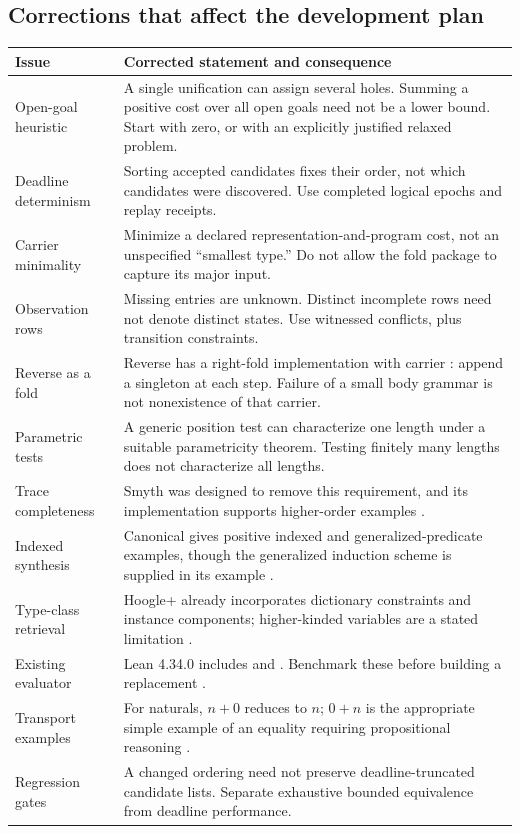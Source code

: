 \documentclass[11pt,a4paper]{article}
\newcommand{\code}[1]{\texttt{\detokenize{#1}}}
\theoremstyle{definition}
\theoremstyle{remark}
\begin{document}
\subsection{Corrections that affect the development plan}
\begin{longtable}{@{}L{.25\textwidth}L{.70\textwidth}@{}}
\toprule
Issue & Corrected statement and consequence\\
\midrule\endhead
Open-goal heuristic & A single unification can assign several holes. Summing a
positive cost over all open goals need not be a lower bound. Start with zero,
or with an explicitly justified relaxed problem.\\
Deadline determinism & Sorting accepted candidates fixes their order, not
which candidates were discovered. Use completed logical epochs and replay
receipts.\\
Carrier minimality & Minimize a declared representation-and-program cost, not
an unspecified ``smallest type.'' Do not allow the fold package to capture its
major input.\\
Observation rows & Missing entries are unknown. Distinct incomplete rows need
not denote distinct states. Use witnessed conflicts, plus transition
constraints.\\
Reverse as a fold & Reverse has a right-fold implementation with carrier
\code{List A}: append a singleton at each step. Failure of a small body grammar
is not nonexistence of that carrier.\\
Parametric tests & A generic position test can characterize one length under a
suitable parametricity theorem. Testing finitely many lengths does not
characterize all lengths.\\
Trace completeness & Smyth was designed to remove this requirement, and its
implementation supports higher-order examples \cite{smyth}.\\
Indexed synthesis & Canonical gives positive indexed and generalized-predicate
examples, though the generalized induction scheme is supplied in its example
\cite{canonical}.\\
Type-class retrieval & Hoogle+ already incorporates dictionary constraints and
instance components; higher-kinded variables are a stated limitation
\cite{hoogle}.\\
Existing evaluator & Lean 4.34.0 includes \code{cbv} and \code{decide_cbv}.
Benchmark these before building a replacement \cite{leancbv}.\\
Transport examples & For naturals, $n+0$ reduces to $n$; $0+n$ is the appropriate
simple example of an equality requiring propositional reasoning
\cite{leaninductbook}.\\
Regression gates & A changed ordering need not preserve deadline-truncated
candidate lists. Separate exhaustive bounded equivalence from deadline
performance.\\
\bottomrule
\end{longtable}
\end{document}
